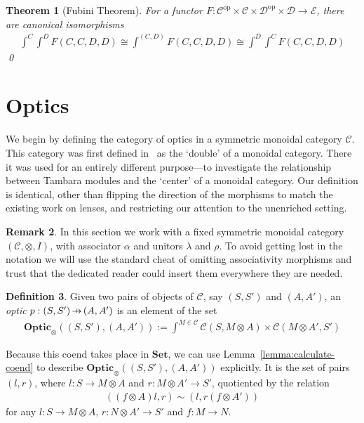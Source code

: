 \documentclass[11pt,letterpaper]{article}
\theoremstyle{plain}
\newtheorem{theorem}{Theorem}[subsection]
\theoremstyle{definition}
\newtheorem{definition}[theorem]{Definition}
\newtheorem{remark}[theorem]{Remark}
\newcommand{\C}{\mathscr{C}}
\newcommand{\D}{\mathscr{D}}
\newcommand{\E}{\mathscr{E}}
\newcommand{\Set}{\mathbf{Set}}
\newcommand{\Optic}{\mathbf{Optic}}
\newcommand{\op}{\mathrm{op}}
\newcommand{\hto}{\ensuremath{\,\mathaccent\shortmid\rightarrow\,}}
\begin{document}
\begin{theorem}[Fubini Theorem]
For a functor $F : \C^\op \times \C \times \D^\op \times \D \to \E$, there are canonical isomorphisms
\begin{align*}
\int^C \int^D F(C,C,D,D) \cong \int^{(C,D)} F(C,C,D,D) \cong \int^D \int^C F(C,C,D,D)
\end{align*}
\qed
\end{theorem}

\section{Optics}\label{sec:optics}

We begin by defining the category of optics in a symmetric monoidal category $\C$. This category was first defined in~\cite[Section 6]{Doubles} as the `double' of a monoidal category. There it was used for an entirely different purpose---to investigate the relationship between Tambara modules and the `center' of a monoidal category. Our definition is identical, other than flipping the direction of the morphisms to match the existing work on lenses, and restricting our attention to the unenriched setting.

\begin{remark}
  In this section we work with a fixed symmetric monoidal category $(\C, \otimes, I)$, with associator $\alpha$ and unitors $\lambda$ and $\rho$. To avoid getting lost in the notation we will use the standard cheat of omitting associativity morphisms and trust that the dedicated reader could insert them everywhere they are needed.
\end{remark}

\begin{definition}
  Given two pairs of objects of $\C$, say $(S, S')$ and $(A, A')$, an \emph{optic} $p : (S, S') \hto (A, A')$ is an element of the set
  \begin{align*}
    \Optic_\otimes((S, S'), (A, A')) := \int^{M \in \C} \C(S, M \otimes A) \times \C(M \otimes A', S')
  \end{align*}
\end{definition}

Because this coend takes place in $\Set$, we can use Lemma~\ref{lemma:calculate-coend} to describe $\Optic_\otimes((S, S'), (A, A'))$ explicitly. It is the set of pairs $(l, r)$, where $l : S \to M \otimes A$ and $r : M \otimes A' \to S'$, quotiented by the relation
\begin{align*}
  ((f \otimes A) l, r) \sim (l, r (f \otimes A'))
\end{align*}
for any $l : S \to M \otimes A$, $r : N \otimes A' \to S'$ and $f : M \to N$.
\end{document}
